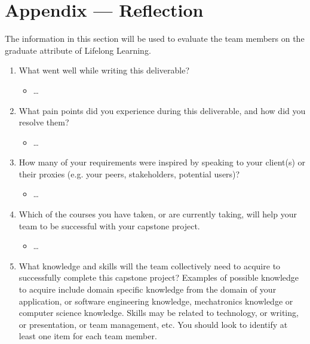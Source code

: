 \section*{Appendix --- Reflection}


The information in this section will be used to evaluate the team members on the
graduate attribute of Lifelong Learning.  

%

\begin{enumerate}
  \item What went well while writing this deliverable?
  
	\begin{itemize}
		\item \dots
	\end{itemize}  
  
  \item What pain points did you experience during this deliverable, and how did
  you resolve them?
  
	\begin{itemize}
		\item \dots
	\end{itemize}    
  
  \item How many of your requirements were inspired by speaking to your
  client(s) or their proxies (e.g. your peers, stakeholders, potential users)?
  
	\begin{itemize}
		\item \dots
	\end{itemize}    
  
  \item Which of the courses you have taken, or are currently taking, will help
  your team to be successful with your capstone project.
  
	\begin{itemize}
		\item \dots
	\end{itemize}    
  
  \item What knowledge and skills will the team collectively need to acquire to
  successfully complete this capstone project?  Examples of possible knowledge
  to acquire include domain specific knowledge from the domain of your
  application, or software engineering knowledge, mechatronics knowledge or
  computer science knowledge.  Skills may be related to technology, or writing,
  or presentation, or team management, etc.  You should look to identify at
  least one item for each team member.
  

\end{enumerate}
